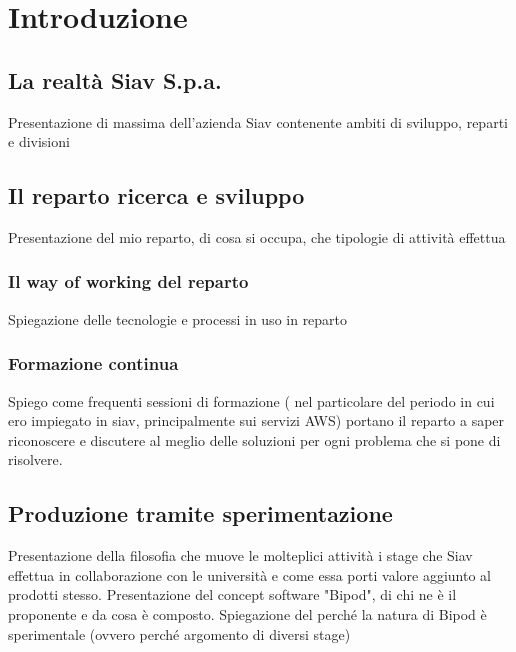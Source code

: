 
\chapter{Introduzione}
\label{cap:introduzione}
\section{La realtà Siav S.p.a.}

Presentazione di massima dell'azienda Siav contenente ambiti di sviluppo, reparti e divisioni

\section{Il reparto ricerca e sviluppo}

Presentazione del mio reparto, di cosa si occupa, che tipologie di attività effettua
\subsection{Il way of working del reparto}
Spiegazione delle tecnologie e processi in uso in reparto

\subsection{Formazione continua}
Spiego come frequenti sessioni di formazione ( nel particolare del periodo in cui ero impiegato in siav, principalmente sui servizi AWS) portano il reparto a saper riconoscere e discutere al meglio delle soluzioni per ogni problema che si pone di risolvere.

\section{Produzione tramite sperimentazione}
Presentazione della filosofia che muove le molteplici attività i stage che Siav effettua in collaborazione con le università e come essa porti valore aggiunto al prodotti stesso.
Presentazione del concept software "Bipod", di chi ne è il proponente e da cosa è composto.
Spiegazione del perché la natura di Bipod è sperimentale (ovvero perché argomento di diversi stage)
